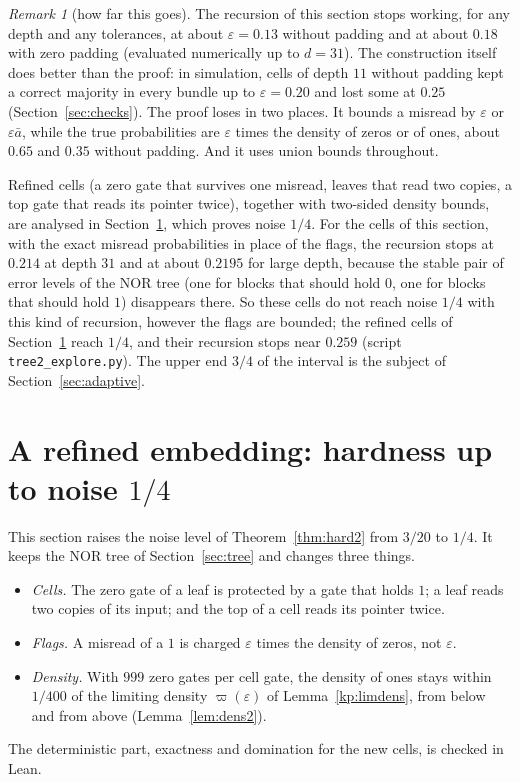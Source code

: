 \documentclass[11pt]{amsart}
\theoremstyle{definition}
\theoremstyle{remark}
\newtheorem{remark}[theorem]{Remark}
\newcommand{\eps}{\varepsilon}
\begin{document}
\begin{remark}[how far this goes]\label{rem:limits}
The recursion of this section stops working, for any depth and any tolerances, at about
$\eps=0.13$ without padding and at about $0.18$ with zero padding (evaluated numerically up to
$d=31$). The construction itself does better than the proof: in simulation, cells of depth $11$
without padding kept a correct majority in every bundle up to $\eps=0.20$ and lost some at $0.25$
(Section~\ref{sec:checks}). The proof loses in two places. It bounds a misread by $\eps$ or
$\eps\bar a$, while the true probabilities are $\eps$ times the density of zeros or of ones, about
$0.65$ and $0.35$ without padding. And it uses union bounds throughout.

Refined cells (a zero gate that survives one misread, leaves that read two copies, a top gate that
reads its pointer twice), together with two-sided density bounds, are analysed in
Section~\ref{sec:tree2}, which proves noise $1/4$. For the cells of this section, with the exact
misread probabilities in place of the flags, the recursion stops at $0.214$ at depth $31$ and at
about $0.2195$ for large depth, because the stable pair of error levels of the NOR tree (one for
blocks that should hold $0$, one for blocks that should hold $1$) disappears there. So these cells
do not reach noise $1/4$ with this kind of recursion, however the flags are bounded; the refined
cells of Section~\ref{sec:tree2} reach $1/4$, and their recursion stops near $0.259$
(script \texttt{tree2\_explore.py}). The upper end $3/4$ of the interval is the subject of Section~\ref{sec:adaptive}.
\end{remark}

\section{A refined embedding: hardness up to noise \texorpdfstring{$1/4$}{1/4}}\label{sec:tree2}

This section raises the noise level of Theorem~\ref{thm:hard2} from $3/20$ to $1/4$. It keeps
the NOR tree of Section~\ref{sec:tree} and changes three things.
\begin{itemize}[leftmargin=2em]
\item \emph{Cells.} The zero gate of a leaf is protected by a gate that holds $1$; a leaf reads
two copies of its input; and the top of a cell reads its pointer twice.
\item \emph{Flags.} A misread of a $1$ is charged $\eps$ times the density of zeros, not $\eps$.
\item \emph{Density.} With $999$ zero gates per cell gate, the density of ones stays within
$1/400$ of the limiting density $\varpi(\eps)$ of Lemma~\ref{kp:limdens}, from below and from above
(Lemma~\ref{lem:dens2}).
\end{itemize}
The deterministic part, exactness and domination for the new cells, is checked in Lean.
\end{document}
